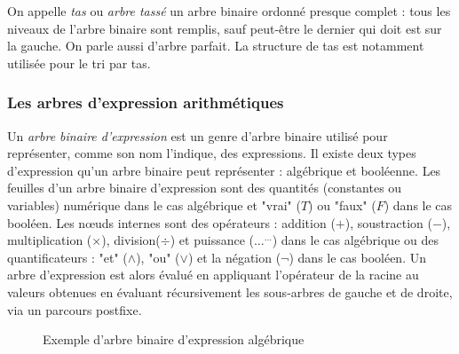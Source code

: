 \documentclass{report}
\begin{document}
On appelle \textit{tas} ou \textit{arbre tassé} un arbre binaire ordonné presque complet : tous les niveaux de l'arbre binaire sont remplis, sauf peut-être le dernier qui doit est sur la gauche. On parle aussi d'arbre parfait. La structure de tas est notamment utilisée pour le tri par tas. 

\subsubsection{Les arbres d'expression arithmétiques}

Un \textit{arbre binaire d'expression} est un genre d'arbre binaire utilisé pour représenter, comme son nom l'indique, des expressions. Il existe deux types d'expression qu'un arbre binaire peut représenter : algébrique et booléenne.
Les feuilles d'un arbre binaire d'expression sont des quantités (constantes ou variables) numérique dans le cas algébrique et "vrai" ($T$) ou "faux" ($F$) dans le cas booléen.
Les nœuds internes sont des opérateurs : addition ($+$), soustraction ($-$), multiplication ($\times$), division($\div$) et puissance ($\ldots^{\ldots}$) dans le cas algébrique ou des quantificateurs : "et" ($\wedge$), "ou" ($\vee$) et la négation ($\neg$) dans le cas booléen.
Un arbre d'expression est alors évalué en appliquant l'opérateur de la racine au valeurs obtenues en évaluant récursivement les sous-arbres de gauche et de droite, via un parcours postfixe. 
\begin{figure}
\begin{center}
\caption{Exemple d'arbre binaire d'expression algébrique} \label{fig:Exemple d'arbre binaire d'expression algébrique}
\end{center}
\end{figure} 
\end{document}
